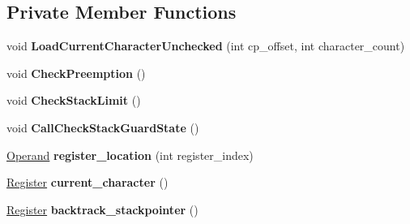 \subsection*{Private Member Functions}
\begin{DoxyCompactItemize}
\item 
void {\bfseries Load\+Current\+Character\+Unchecked} (int cp\+\_\+offset, int character\+\_\+count)\hypertarget{classv8_1_1internal_1_1_reg_exp_macro_assembler_x64_aa6e538367b470838af78b4942856c240}{}\label{classv8_1_1internal_1_1_reg_exp_macro_assembler_x64_aa6e538367b470838af78b4942856c240}

\item 
void {\bfseries Check\+Preemption} ()\hypertarget{classv8_1_1internal_1_1_reg_exp_macro_assembler_x64_a67e2454ff61f5cfdb11cf7f2edb3afb1}{}\label{classv8_1_1internal_1_1_reg_exp_macro_assembler_x64_a67e2454ff61f5cfdb11cf7f2edb3afb1}

\item 
void {\bfseries Check\+Stack\+Limit} ()\hypertarget{classv8_1_1internal_1_1_reg_exp_macro_assembler_x64_a4f4af2c7ed82f1fe8546470b197c6891}{}\label{classv8_1_1internal_1_1_reg_exp_macro_assembler_x64_a4f4af2c7ed82f1fe8546470b197c6891}

\item 
void {\bfseries Call\+Check\+Stack\+Guard\+State} ()\hypertarget{classv8_1_1internal_1_1_reg_exp_macro_assembler_x64_a98190d468665befd547673247c05a654}{}\label{classv8_1_1internal_1_1_reg_exp_macro_assembler_x64_a98190d468665befd547673247c05a654}

\item 
\hyperlink{classv8_1_1internal_1_1_operand}{Operand} {\bfseries register\+\_\+location} (int register\+\_\+index)\hypertarget{classv8_1_1internal_1_1_reg_exp_macro_assembler_x64_a050446072fc168ec4c909e47a36785cc}{}\label{classv8_1_1internal_1_1_reg_exp_macro_assembler_x64_a050446072fc168ec4c909e47a36785cc}

\item 
\hyperlink{structv8_1_1internal_1_1_register}{Register} {\bfseries current\+\_\+character} ()\hypertarget{classv8_1_1internal_1_1_reg_exp_macro_assembler_x64_a9cf35c9ed828cfbfb19055440b16852a}{}\label{classv8_1_1internal_1_1_reg_exp_macro_assembler_x64_a9cf35c9ed828cfbfb19055440b16852a}

\item 
\hyperlink{structv8_1_1internal_1_1_register}{Register} {\bfseries backtrack\+\_\+stackpointer} ()\hypertarget{classv8_1_1internal_1_1_reg_exp_macro_assembler_x64_a7ee2ad3aa33b1e86b7da58e2f67b52be}{}\label{classv8_1_1internal_1_1_reg_exp_macro_assembler_x64_a7ee2ad3aa33b1e86b7da58e2f67b52be}


\end{DoxyCompactItemize}
